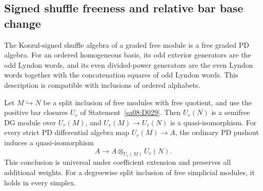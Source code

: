 \subsection{Signed shuffle freeness and relative bar base change}

\begin{theorem}
\label{sa08:C24}
The Koszul-signed shuffle algebra of a graded free module is a free
graded PD algebra. For an ordered homogeneous basis, its odd exterior
generators are the odd Lyndon words, and its even divided-power
generators are the even Lyndon words together with the concatenation
squares of odd Lyndon words. This description is compatible with
inclusions of ordered alphabets.

Let $M\hookrightarrow N$ be a split inclusion of free modules with
free quotient, and use the positive bar closures $U_r$ of
Statement~\ref{sa08:D029}. Then $U_r(N)$ is a semifree DG module
over $U_r(M)$, and $U_r(M)\to U_r(N)$ is a quasi-isomorphism.
For every strict PD differential algebra map $U_r(M)\to A$, the
ordinary PD pushout induces a quasi-isomorphism
\[
 A\longrightarrow A\otimes_{U_r(M)}U_r(N).
 \tag{C-24a}
\]
This conclusion is universal under coefficient extension and
preserves all additional weights. For a degreewise split inclusion
of free simplicial modules, it holds in every simplex.
\end{theorem}
